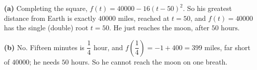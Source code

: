 \textbf{(a)} Completing the square, $f(t)=40000-16(t-50)^2$. So his greatest distance from Earth is exactly $40000$ miles, reached at $t=50$, and $f(t)=40000$ has the single (double) root $t=50$. He just reaches the moon, after $\boxed{50\text{ hours}}$.

\textbf{(b)} No. Fifteen minutes is $\dfrac14$ hour, and $f\left(\dfrac14\right)=-1+400=399$ miles, far short of $40000$; he needs $50$ hours. So he cannot reach the moon on one breath.
